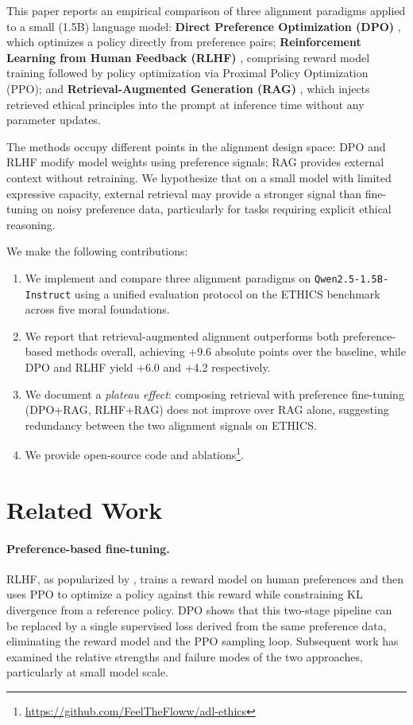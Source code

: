 This paper reports an empirical comparison of three alignment paradigms applied to a small (1.5B) language model:
\textbf{Direct Preference Optimization (DPO)} \citep{rafailov2023dpo}, which optimizes a policy directly from preference pairs;
\textbf{Reinforcement Learning from Human Feedback (RLHF)} \citep{ouyang2022instructgpt}, comprising reward model training followed by policy optimization via Proximal Policy Optimization (PPO);
and \textbf{Retrieval-Augmented Generation (RAG)} \citep{lewis2020rag}, which injects retrieved ethical principles into the prompt at inference time without any parameter updates.

The methods occupy different points in the alignment design space: DPO and RLHF modify model weights using preference signals; RAG provides external context without retraining. We hypothesize that on a small model with limited expressive capacity, external retrieval may provide a stronger signal than fine-tuning on noisy preference data, particularly for tasks requiring explicit ethical reasoning.

We make the following contributions:
\begin{enumerate}
    \item We implement and compare three alignment paradigms on \texttt{Qwen2.5-1.5B-Instruct} using a unified evaluation protocol on the ETHICS benchmark across five moral foundations.
    \item We report that retrieval-augmented alignment outperforms both preference-based methods overall, achieving +9.6 absolute points over the baseline, while DPO and RLHF yield +6.0 and +4.2 respectively.
    \item We document a \emph{plateau effect}: composing retrieval with preference fine-tuning (DPO+RAG, RLHF+RAG) does not improve over RAG alone, suggesting redundancy between the two alignment signals on ETHICS.
    \item We provide open-source code and ablations\footnote{\url{https://github.com/FeelTheFloww/adl-ethics}}.
\end{enumerate}

\section{Related Work}

\paragraph{Preference-based fine-tuning.} RLHF, as popularized by \citet{ouyang2022instructgpt}, trains a reward model on human preferences and then uses PPO \citep{schulman2017ppo} to optimize a policy against this reward while constraining KL divergence from a reference policy. DPO \citep{rafailov2023dpo} shows that this two-stage pipeline can be replaced by a single supervised loss derived from the same preference data, eliminating the reward model and the PPO sampling loop. Subsequent work \citep{azar2024ipo,xu2024dpo_failures} has examined the relative strengths and failure modes of the two approaches, particularly at small model scale.

